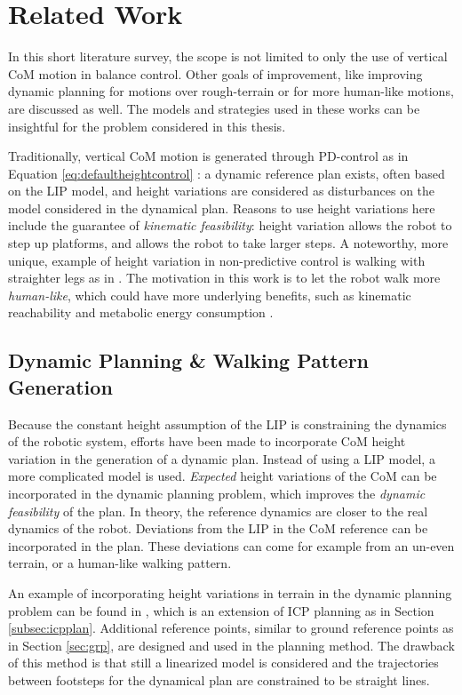 \section{Related Work}\label{sec:relatedworksheight}
In this short literature survey, the scope is not limited to only the use of vertical \ac{CoM} motion in balance control. Other goals of improvement, like improving dynamic planning for motions over rough-terrain or for more human-like motions, are discussed as well. The models and strategies used in these works can be insightful for the problem considered in this thesis.

Traditionally, vertical \ac{CoM} motion is generated through PD-control as in Equation \eqref{eq:defaultheightcontrol} \cite{kajita2003resolved, koolen2016design}: a dynamic reference plan exists, often based on the LIP model, and height variations are considered as disturbances on the model considered in the dynamical plan. Reasons to use height variations here include the guarantee of \textit{kinematic feasibility}: height variation allows the robot to step up platforms, and allows the robot to take larger steps. A noteworthy, more unique, example of height variation in non-predictive control is walking with straighter legs as in \cite{griffin2018straight}. The motivation in this work is to let the robot walk more \textit{human-like}, which could have more underlying benefits, such as kinematic reachability and metabolic energy consumption \cite{wang2012optimizing}.

\subsection{Dynamic Planning \& Walking Pattern Generation}
Because the constant height assumption of the \ac{LIP} is constraining the dynamics of the robotic system, efforts have been made to incorporate CoM height variation in the generation of a dynamic plan. Instead of using a LIP model, a more complicated model is used. \textit{Expected} height variations of the CoM can be incorporated in the dynamic planning problem, which improves the \textit{dynamic feasibility} of the plan. In theory, the reference dynamics are closer to the real dynamics of the robot. Deviations from the \ac{LIP} in the \ac{CoM} reference can be incorporated in the plan. These deviations can come for example from an un-even terrain, or a human-like walking pattern.

An example of incorporating height variations in terrain in the dynamic planning problem can be found in \cite{englsberger2013three}, which is an extension of \ac{ICP} planning as in Section \ref{subsec:icpplan}. Additional reference points, similar to ground reference points as in Section \ref{sec:grp}, are designed and used in the planning method. The drawback of this method is that still a linearized model is considered and the trajectories between footsteps for the dynamical plan are constrained to be straight lines. 

